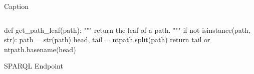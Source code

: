 \documentclass[a4paper, oneside, onecolumn, 11pt]{memoir}
\newenvironment{code}{\captionsetup{type=listing}}{}
\begin{document}
\begin{code}
	\caption{Caption}
	\label{SourceCode:1}
    \inputminted[firstline=1, lastline=5, frame=single, framesep=2mm, fontsize=\footnotesize, linenos%
]{python}{kode.py}
\end{code}


\begin{listing}[H]
\begin{pythoncode}
def get_path_leaf(path):
    """ return the leaf of a path. """
    if not isinstance(path, str):
        path = str(path)
    head, tail = ntpath.split(path)
    return tail or ntpath.basename(head)
\end{pythoncode}
\caption{SPARQL Endpoint}
\label{lst:SPARQL Endpoint}
\end{listing}
\end{document}
